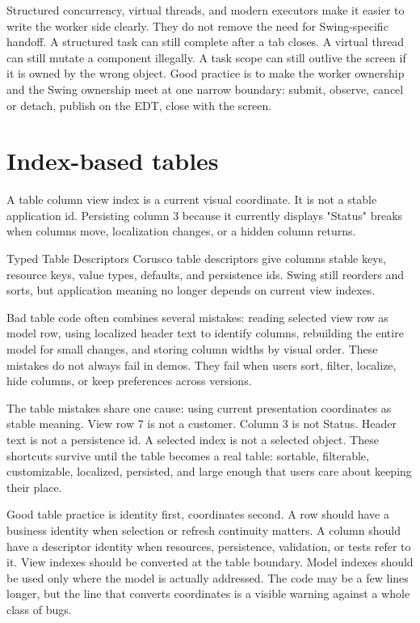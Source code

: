Structured concurrency, virtual threads, and modern executors make it easier to
write the worker side clearly. They do not remove the need for Swing-specific
handoff. A structured task can still complete after a tab closes. A virtual
thread can still mutate a component illegally. A task scope can still outlive
the screen if it is owned by the wrong object. Good practice is to make the
worker ownership and the Swing ownership meet at one narrow boundary: submit,
observe, cancel or detach, publish on the EDT, close with the screen.

\section{Index-based tables}

A table column view index is a current visual coordinate. It is not a stable application id. Persisting column 3 because it currently displays "Status" breaks when columns move, localization changes, or a hidden column returns.

\begin{coruscobox}{Typed Table Descriptors}
Corusco table descriptors give columns stable keys, resource keys, value types, defaults, and persistence ids. Swing still reorders and sorts, but application meaning no longer depends on current view indexes.
\end{coruscobox}

Bad table code often combines several mistakes: reading selected view row as model row, using localized header text to identify columns, rebuilding the entire model for small changes, and storing column widths by visual order. These mistakes do not always fail in demos. They fail when users sort, filter, localize, hide columns, or keep preferences across versions.

The table mistakes share one cause: using current presentation coordinates as
stable meaning. View row 7 is not a customer. Column 3 is not Status. Header
text is not a persistence id. A selected index is not a selected object. These
shortcuts survive until the table becomes a real table: sortable, filterable,
customizable, localized, persisted, and large enough that users care about
keeping their place.

Good table practice is identity first, coordinates second. A row should have a
business identity when selection or refresh continuity matters. A column should
have a descriptor identity when resources, persistence, validation, or tests
refer to it. View indexes should be converted at the table boundary. Model
indexes should be used only where the model is actually addressed. The code may
be a few lines longer, but the line that converts coordinates is a visible
warning against a whole class of bugs.

